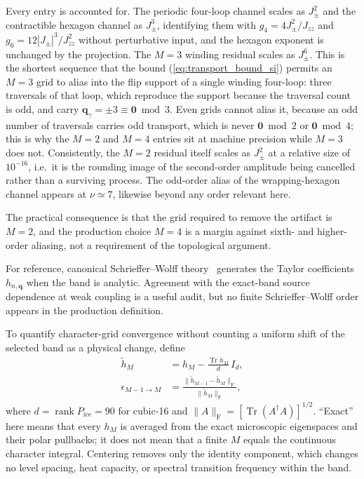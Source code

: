 \documentclass[aps,prl,onecolumn,amsmath,amssymb]{revtex4-2}
\newcommand{\Jzz}{J_{zz}}
\newcommand{\Jpm}{J_{\pm}}
\newcommand{\bq}{\bm q}
\newcommand{\Pice}{P_{\mathrm{ice}}}
\begin{document}
Every entry is accounted for.  The periodic four-loop channel scales as
$\Jpm^2$ and the contractible hexagon channel as $\Jpm^3$, identifying them
with $g_4=4\Jpm^2/\Jzz$ and $g_6=12|\Jpm|^3/\Jzz^2$ without perturbative
input, and the hexagon exponent is unchanged by the projection.
The $M=3$ winding residual scales as $\Jpm^6$.  This is the shortest sequence
that the bound (\ref{eq:transport_bound_si}) permits an $M=3$ grid to alias
into the flip support of a single winding four-loop: three traversals of that
loop, which reproduce the support because the traversal count is odd, and
carry $\bq_\gamma=\pm3\equiv\bm0\bmod3$.  Even grids cannot alias it, because
an odd number of traversals carries odd transport, which is never
$\bm0\bmod2$ or $\bm0\bmod4$; this is why the $M=2$ and $M=4$ entries sit at
machine precision while $M=3$ does not.  Consistently, the $M=2$ residual
itself scales as $\Jpm^{2}$ at a relative size of $10^{-16}$, i.e.\ it is the
rounding image of the second-order amplitude being cancelled rather than a
surviving process.  The odd-order alias of the wrapping-hexagon channel
appears at $\nu\simeq7$, likewise beyond any order relevant here.

The practical consequence is that the grid required to remove the artifact is
$M=2$, and the production choice $M=4$ is a margin against sixth- and
higher-order aliasing, not a requirement of the topological argument.

For reference, canonical Schrieffer--Wolff theory~\cite{Bravyi2011} generates
the Taylor coefficients $h_{n,\bq}$ when the band is analytic.  Agreement
with the exact-band source dependence at weak coupling is a useful audit, but
no finite Schrieffer--Wolff order appears in the production definition.

To quantify character-grid convergence without counting a uniform shift of
the selected band as a physical change, define
\begin{align}
 \widetilde h_M&=h_M-\frac{\operatorname{Tr}h_M}{d}\,I_d,\\
 \epsilon_{M-1\to M}&=
 \frac{\|\widetilde h_{M-1}-\widetilde h_M\|_{\mathrm F}}
      {\|\widetilde h_M\|_{\mathrm F}},
\label{eq:centered_change_si}
\end{align}
where $d=\operatorname{rank}\Pice=90$ for cubic-16 and
$\|A\|_{\mathrm F}=[\operatorname{Tr}(A^\dagger A)]^{1/2}$.  ``Exact'' here
means that every $h_M$ is averaged from the exact microscopic eigenspaces and
their polar pullbacks; it does not mean that a finite $M$ equals the continuous
character integral.  Centering removes only the identity component, which
changes no level spacing, heat capacity, or spectral transition frequency
within the band.
\end{document}
